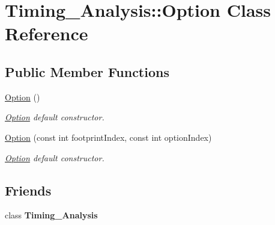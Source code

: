 \hypertarget{classTiming__Analysis_1_1Option}{\section{Timing\-\_\-\-Analysis\-:\-:Option Class Reference}
\label{classTiming__Analysis_1_1Option}
}
\subsection*{Public Member Functions}
\begin{DoxyCompactItemize}
\item 
\hypertarget{classTiming__Analysis_1_1Option_ac426169d74c9d432f168255b6cb52544}{\hyperlink{classTiming__Analysis_1_1Option_ac426169d74c9d432f168255b6cb52544}{Option} ()}\label{classTiming__Analysis_1_1Option_ac426169d74c9d432f168255b6cb52544}

\begin{DoxyCompactList}\small\item\em \hyperlink{classTiming__Analysis_1_1Option}{Option} default constructor. \end{DoxyCompactList}\item 
\hyperlink{classTiming__Analysis_1_1Option_a1d95559d49ea714e293a8679cefe8295}{Option} (const int footprint\-Index, const int option\-Index)
\begin{DoxyCompactList}\small\item\em \hyperlink{classTiming__Analysis_1_1Option}{Option} default constructor. \end{DoxyCompactList}\end{DoxyCompactItemize}
\subsection*{Friends}
\begin{DoxyCompactItemize}
\item 
\hypertarget{classTiming__Analysis_1_1Option_aab560f9cdcd55852a6a08a29a54a2b16}{class {\bfseries Timing\-\_\-\-Analysis}}\label{classTiming__Analysis_1_1Option_aab560f9cdcd55852a6a08a29a54a2b16}

\end{DoxyCompactItemize}


